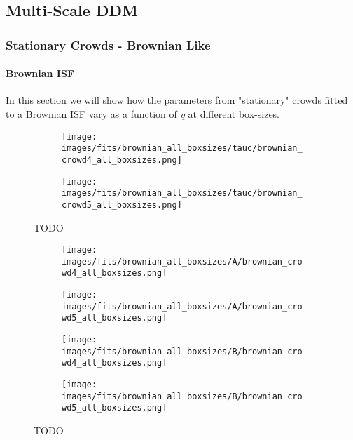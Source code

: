 \documentclass[10pt]{article}
\begin{document}
\subsection{Multi-Scale DDM}

\subsubsection{Stationary Crowds - Brownian Like}
\paragraph{Brownian ISF} In this section we will show how the parameters from "stationary" crowds fitted to a Brownian ISF vary as a function of \textit{q} at different box-sizes. 
\begin{figure}[H]
\begin{subfigure}[t]{\textwidth}
  \centering
 \texttt{[image: images/fits/brownian\_all\_boxsizes/tauc/brownian\_crowd4\_all\_boxsizes.png]}
  \caption{}
\end{subfigure}%
\hfill
\begin{subfigure}[t]{\textwidth}
  \centering
  \texttt{[image: images/fits/brownian\_all\_boxsizes/tauc/brownian\_crowd5\_all\_boxsizes.png]}
  \caption{}
\end{subfigure}
\caption{TODO}
\label{fig:crowd_brownian_fits_tauc_all_boxsizes}
\end{figure}

\begin{figure}[H]
\begin{subfigure}[t]{.5\textwidth}
  \centering
 \texttt{[image: images/fits/brownian\_all\_boxsizes/A/brownian\_crowd4\_all\_boxsizes.png]}
  \caption{}
\end{subfigure}%
\hfill
\begin{subfigure}[t]{.5\textwidth}
  \centering
  \texttt{[image: images/fits/brownian\_all\_boxsizes/A/brownian\_crowd5\_all\_boxsizes.png]}
  \caption{}
\end{subfigure}
\label{fig:crowd_brownian_fits_A_all_boxsizes}
\par\bigskip
\begin{subfigure}[t]{.5\textwidth}
  \centering
 \texttt{[image: images/fits/brownian\_all\_boxsizes/B/brownian\_crowd4\_all\_boxsizes.png]}
  \caption{}
\end{subfigure}%
\hfill
\begin{subfigure}[t]{.5\textwidth}
  \centering
  \texttt{[image: images/fits/brownian\_all\_boxsizes/B/brownian\_crowd5\_all\_boxsizes.png]}
  \caption{}
\end{subfigure}
\caption{TODO}
\label{fig:crowd_brownian_fits_tauc_B_boxsizes}
\end{figure}
\end{document}
